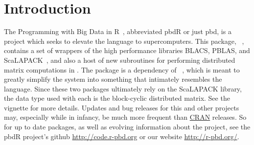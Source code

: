 
\section[]{Introduction}
\label{sec:introduction}


The Programming with Big Data in R~\citep{pbdr2012}, abbreviated pbdR or just pbd, is a project which seeks to elevate the  language to supercomputers.  This package, ~\citep{Schmidt2012pbdBASEpackage}, contains a set of wrappers of the high performance libraries BLACS, PBLAS, and ScaLAPACK~\citep{slug}, and also a host of new subroutines for performing distributed matrix computations in .  The package is a dependency of ~\citep{Schmidt2012pbdDMATpackage}, which is meant to greatly simplify the  system into something that intimately resembles the  language.  Since these two packages ultimately rely on the ScaLAPACK library, the data type used with each is the block-cyclic distributed matrix.  See the  vignette for more details.
\np
Updates and bug releases for this and other  projects may, especially while in infancy, be much more frequent than \href{http://cran.r-project.org/}{CRAN} releases.  So for up to date packages, as well as evolving information about the  project,  see the pbdR project's github \url{http://code.r-pbd.org} or our website \href{http://r-pbd.org/}{http://r-pbd.org/}.





